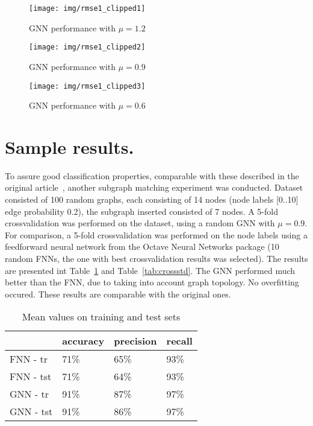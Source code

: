 \documentclass[a4paper, 11pt, twocolumn]{spie}  %
\begin{document}
\begin{figure}
\begin{center}
	\texttt{[image: img/rmse1\_clipped1]}
	\caption{GNN performance with $\mu = 1.2$}
	\label{fig:rmse1}
\end{center}
\end{figure}

\begin{figure}
\begin{center}
	\texttt{[image: img/rmse1\_clipped2]}
	\caption{GNN performance with $\mu = 0.9$}
	\label{fig:rmse2}
\end{center}
\end{figure}

\begin{figure}
\begin{center}
	\texttt{[image: img/rmse1\_clipped3]}
	\caption{GNN performance with $\mu = 0.6$}
	\label{fig:rmse3}
\end{center}
\end{figure}

\section{Sample results.}
To assure good classification properties, comparable with these described in the original article~, another subgraph matching experiment was conducted. Dataset consisted of 100 random graphs, each consisting of 14 nodes (node labels [0..10] edge probability 0.2), the subgraph inserted consisted of 7 nodes. A 5-fold crossvalidation was performed on the dataset, using a random GNN with $\mu = 0.9$. For comparison, a 5-fold crossvalidation was performed on the node labels using a feedforward neural network from the Octave Neural Networks package (10 random FNNs, the one with best crossvalidation results was selected). The results are presented int Table~\ref{tab:crossmean} and Table~\ref{tab:crossstd}. The GNN performed much better than the FNN, due to taking into account graph topology. No overfitting occured. These results are comparable with the original ones.

\begin{table}[h!]
	\begin{center}
	\begin{tabular}{llll}
	\toprule
	& accuracy & precision & recall \\
	\midrule
	FNN - tr &	71\% &  65\% & 93\% \\
	FNN - tst &	71\% &  64\% &  93\% \\
	GNN - tr &	91\% &  87\%&  97\% \\
	GNN - tst &	91\% &  86\% &  97\% \\
	\bottomrule
	\end{tabular}
	\caption{Mean values on training and test sets}
	\label{tab:crossmean}
	\end{center}
\end{table}
\end{document}
